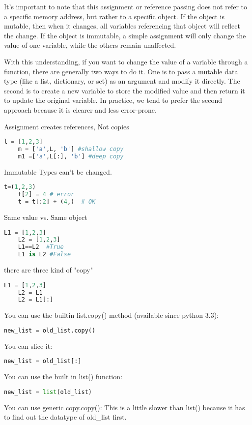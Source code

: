\documentclass[a4paper,12pt,twoside]{book}
\begin{document}
It’s important to note that this assignment or reference passing does not refer to a specific memory address, but rather to a specific object. If the object is mutable, then when it changes, all variables referencing that object will reflect the change. If the object is immutable, a simple assignment will only change the value of one variable, while the others remain unaffected.


With this understanding, if you want to change the value of a variable through a function, there are generally two ways to do it. One is to pass a mutable data type (like a list, dictionary, or set) as an argument and modify it directly. The second is to create a new variable to store the modified value and then return it to update the original variable. In practice, we tend to prefer the second approach because it is clearer and less error-prone.


Assignment creates references, Not copies
\begin{lstlisting}[frame=single, language=Python]
	l = [1,2,3]
	m = ['a',L, 'b'] #shallow copy
	m1 =['a',L[:], 'b'] #deep copy
\end{lstlisting}  

Immutable Types can't be changed. 
\begin{lstlisting}[frame=single, language=Python]
	t=(1,2,3)
	t[2] = 4 # error
	t = t[:2] + (4,)  # OK
\end{lstlisting}  
Same value vs. Same object
\begin{lstlisting}[frame=single, language=Python]
	L1 = [1,2,3]
	L2 = [1,2,3]
	L1==L2  #True
	L1 is L2 #False
\end{lstlisting}  

there are three kind of "copy"
\begin{lstlisting}[frame=single, language=Python]
	L1 = [1,2,3]
	L2 = L1
	L2 = L1[:]
\end{lstlisting}  

You can use the builtin list.copy() method (available since python 3.3):
\begin{lstlisting}[frame=single, language=Python]
	new_list = old_list.copy()
\end{lstlisting}  
You can slice it:
\begin{lstlisting}[frame=single, language=Python]
	new_list = old_list[:]
\end{lstlisting}  
You can use the built in list() function:
\begin{lstlisting}[frame=single, language=Python]
	new_list = list(old_list)
\end{lstlisting}  
You can use generic copy.copy(): This is a little slower than list() because it has to find out the datatype of old\_list first.
\end{document}

